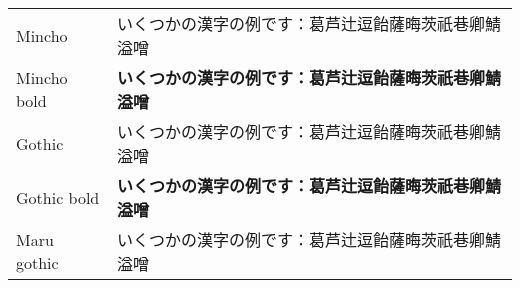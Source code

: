 \documentclass{jsarticle}
\begin{document}
\noindent
\begin{tabular}{ll}
 Mincho & {いくつかの漢字の例です：葛芦辻逗飴薩晦茨祇巷卿鯖溢噌} \\
 Mincho bold & {\bfseries いくつかの漢字の例です：葛芦辻逗飴薩晦茨祇巷卿鯖溢噌} \\
 Gothic & {\gtfamily いくつかの漢字の例です：葛芦辻逗飴薩晦茨祇巷卿鯖溢噌} \\
 Gothic bold & {\gtfamily\bfseries いくつかの漢字の例です：葛芦辻逗飴薩晦茨祇巷卿鯖溢噌} \\
 Maru gothic & {\mgfamily いくつかの漢字の例です：葛芦辻逗飴薩晦茨祇巷卿鯖溢噌}
\end{tabular}
\end{document}
